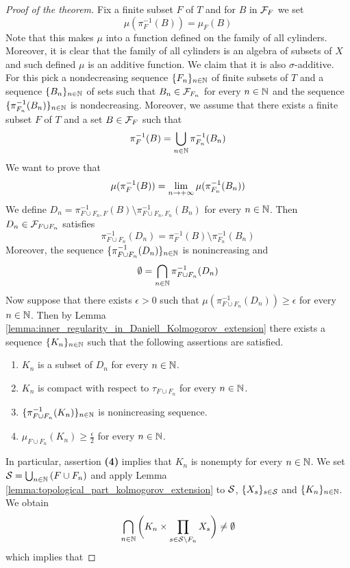 \begin{proof}[Proof of the theorem]
Fix a finite subset $F$ of $T$ and for $B$ in ${\mathcal F}_F$ we set
$$\mu\left(\pi^{-1}_F(B)\right) = \mu_F(B)$$
Note that this makes $\mu$ into a function defined on the family of all cylinders. Moreover, it is clear that the family of all cylinders is an algebra of subsets of $X$ and such defined $\mu$ is an additive function. We claim that it is also $\sigma$-additive. For this pick a nondecreasing sequence $\{F_n\}_{n\in {\mathbb N}}$ of finite subsets of $T$ and a sequence $\{B_n\}_{n\in {\mathbb N}}$ of sets such that $B_n\in {\mathcal F}_{F_n}$ for every $n\in {\mathbb N}$ and the sequence $\{\pi_{F_n}^{-1}(B_n)\}_{n\in {\mathbb N}}$ is nondecreasing. Moreover, we assume that there exists a finite subset $F$ of $T$ and a set $B \in {\mathcal F}_{F}$ such that 
$$\pi_{F}^{-1}(B) = \bigcup_{n\in {\mathbb N}}\pi_{F_n}^{-1}(B_n)$$
We want to prove that
$$\mu(\pi_F^{-1}(B)) = \lim_{n\rightarrow +\infty}\mu(\pi^{-1}_{F_n}(B_n))$$
We define $D_n = \pi_{F\cup F_n,F}^{-1}(B)\setminus \pi_{F\cup F_n,F_n}^{-1}(B_n)$ for every $n\in {\mathbb N}$. Then $D_n \in {\mathcal F}_{F\cup F_n}$ satisfies
$$\pi^{-1}_{F\cup F_n}(D_n) = \pi_F^{-1}(B)\setminus \pi^{-1}_{F_n}(B_n)$$
Moreover, the sequence $\{\pi^{-1}_{F\cup F_n}(D_n)\}_{n\in {\mathbb N}}$ is nonincreasing and 
$$\emptyset = \bigcap_{n\in {\mathbb N}}\pi^{-1}_{F\cup F_n}(D_n)$$
Now suppose that there exists $\epsilon > 0$ such that $\mu\left(\pi^{-1}_{F\cup F_n}(D_n)\right) \geq \epsilon$ for every $n\in {\mathbb N}$. Then by Lemma \ref{lemma:inner_regularity_in_Daniell_Kolmogorov_extension} there exists a sequence $\{K_n\}_{n\in {\mathbb N}}$ such that the following assertions are satisfied.
\begin{enumerate}[label=\textbf{(\arabic*)}, leftmargin=*]
\item $K_n$ is a subset of $D_n$ for every $n\in {\mathbb N}$.
\item $K_n$ is compact with respect to $\tau_{F\cup F_n}$ for every $n\in {\mathbb N}$.
\item $\{\pi^{-1}_{F\cup F_n}(K_n)\}_{n\in {\mathbb N}}$ is nonincreasing sequence.
\item $\mu_{F\cup F_n}(K_n) \geq \frac{\epsilon}{2}$ for every $n\in {\mathbb N}$.
\end{enumerate}
In particular, assertion \textbf{(4)} implies that $K_n$ is nonempty for every $n\in {\mathbb N}$. We set ${\mathcal S} = \bigcup_{n\in {\mathbb N}}\left(F\cup F_n\right)$ and apply Lemma \ref{lemma:topological_part_kolmogorov_extension} to ${\mathcal S}$, $\{X_s\}_{s\in {\mathcal S}}$ and $\{K_n\}_{n\in {\mathbb N}}$. We obtain
$$\bigcap_{n\in {\mathbb N}}\bigg(K_n\times \prod_{s\in {\mathcal S}\setminus F_n}X_s\bigg) \neq \emptyset$$
which implies that

\end{proof}
